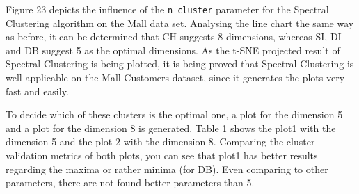  
 Figure 23 depicts the influence of the \verb|n_cluster| parameter for the Spectral Clustering algorithm on the Mall data set. Analysing the line chart the same way as before, it can be determined that CH suggests 8 dimensions, whereas SI, DI and DB suggest 5 as the optimal dimensions. As the t-SNE projected result of Spectral Clustering is being plotted, it is being proved that Spectral Clustering is well applicable on the Mall Customers dataset, since it generates the plots very fast and easily. \newline
 
 
To decide which of these clusters is the optimal one, a plot for the dimension 5 and a plot for the dimension 8 is generated. Table 1 shows the plot1 with the dimension 5 and the plot 2 with the dimension 8. Comparing the cluster validation metrics of both plots, you can see that plot1 has better results regarding the maxima or rather minima (for DB). Even comparing to other parameters, there are not found better parameters than 5.\newline

\hspace{-0.75cm}
\begin{table}[H]
\caption{Comparison Cluster validation of Plot1 and Plot2 with Spectral Clustering}
\label{tab:evalutaion_table_spectral}
\end{table}
 
